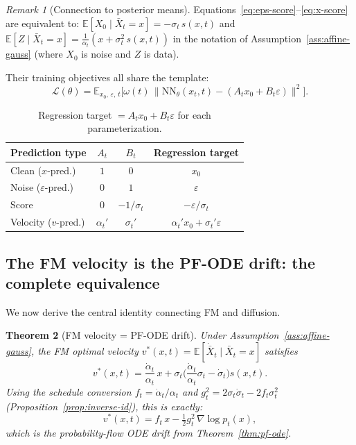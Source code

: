 \documentclass[11pt]{article}
\newcommand{\E}{\mathbb{E}}
\newcommand{\grad}{\nabla}
\newtheorem{theorem}{Theorem}[section]
\theoremstyle{definition}
\theoremstyle{remark}
\newtheorem{remark}[theorem]{Remark}
\begin{document}
\begin{remark}[Connection to posterior means]
Equations~\eqref{eq:eps-score}--\eqref{eq:x-score} are equivalent to: $\E[X_0\mid \bar{X}_t=x] = -\sigma_t\,s(x,t)$ and $\E[Z\mid\bar{X}_t=x] = \frac{1}{\alpha_t}(x+\sigma_t^2\,s(x,t))$ in the notation of Assumption~\ref{ass:affine-gauss} (where $X_0$ is noise and $Z$ is data).
\end{remark}

Their training objectives all share the template:
\begin{equation}\label{eq:general-loss}
\mathcal{L}(\theta) = \E_{x_0,\,\varepsilon,\,t}\!\Big[\omega(t)\,\big\|\mathrm{NN}_\theta(x_t,t) - (A_t x_0 + B_t\varepsilon)\big\|^2\Big].
\end{equation}

\begin{table}[h]
\centering
\renewcommand{\arraystretch}{1.3}
\begin{tabular}{@{} l c c c @{}}
\toprule
\textbf{Prediction type} & $A_t$ & $B_t$ & \textbf{Regression target} \\
\midrule
Clean ($x$-pred.) & $1$ & $0$ & $x_0$ \\
Noise ($\varepsilon$-pred.) & $0$ & $1$ & $\varepsilon$ \\
Score & $0$ & $-1/\sigma_t$ & $-\varepsilon/\sigma_t$ \\
Velocity ($v$-pred.) & $\alpha_t'$ & $\sigma_t'$ & $\alpha_t' x_0 + \sigma_t'\varepsilon$ \\
\bottomrule
\end{tabular}
\caption{Regression target $= A_t x_0 + B_t\varepsilon$ for each parameterization.}
\label{tab:four-param}
\end{table}

\subsection{The FM velocity is the PF-ODE drift: the complete equivalence}\label{subsec:fm-eq-diff}

We now derive the central identity connecting FM and diffusion.

\begin{theorem}[FM velocity = PF-ODE drift]\label{thm:fm-eq-pf}
Under Assumption~\ref{ass:affine-gauss}, the FM optimal velocity $v^*(x,t) = \E[\dot{\bar{X}}_t\mid \bar{X}_t = x]$ satisfies
\begin{equation}\label{eq:vel-score}
v^*(x,t) = \frac{\dot\alpha_t}{\alpha_t}\,x + \sigma_t\!\Big(\frac{\dot\alpha_t}{\alpha_t}\sigma_t - \dot\sigma_t\Big)s(x,t).
\end{equation}
Using the schedule conversion $f_t = \dot\alpha_t/\alpha_t$ and $g_t^2 = 2\sigma_t\dot\sigma_t - 2f_t\sigma_t^2$ (Proposition~\ref{prop:inverse-id}), this is exactly:
\begin{equation}\label{eq:v-eq-pf}
\boxed{v^*(x,t) = f_t\,x - \tfrac{1}{2}g_t^2\,\grad\log p_t(x),}
\end{equation}
which is the probability-flow ODE drift from Theorem~\ref{thm:pf-ode}.
\end{theorem}
\end{document}
